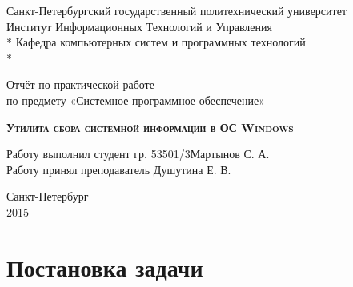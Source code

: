 \documentclass[a4paper, 12pt]{report}		%
\begin{document}
\begin{titlepage}
\thispagestyle{empty}

\begin{center}
Санкт-Петербургский государственный политехнический университет \\
Институт Информационных Технологий и Управления \\*
Кафедра компьютерных систем и программных технологий \\*
\hrulefill
\end{center}

\vspace{18em}

\begin{center}
\Large Отчёт по практической работе\\по предмету «Системное программное обеспечение» \\
\end{center}

\vspace{1em}

\begin{center}
\textsc{\textbf{Утилита сбора системной информации в ОС Windows}}
\end{center}

\vspace{16em}

\begin{flushleft}
Работу выполнил студент гр. 53501/3\hrulefill Мартынов С. А. \\
\vspace{1.5em}
Работу принял преподаватель \hrulefill Душутина Е. В. \\
\end{flushleft}

\vspace{\fill}

\begin{center}
Санкт-Петербург \\
2015
\end{center}

\end{titlepage}
\setcounter{page}{2}
\tableofcontents


\chapter*{Постановка задачи}
\end{document}
